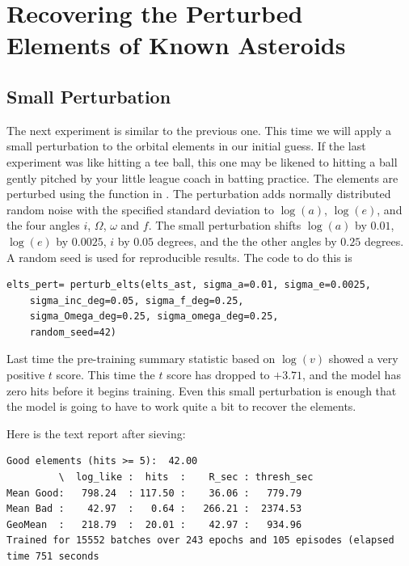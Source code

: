 \section{Recovering the Perturbed Elements of Known Asteroids}
\label{section_results_known_ast_perturbed}

\subsection{Small Perturbation}
The next experiment is similar to the previous one.
This time we will apply a small perturbation to the orbital elements in our initial guess.
If the last experiment was like hitting a tee ball, this one may be likened to hitting a ball gently pitched by your little league coach in batting practice.
The elements are perturbed using the function  in .
The perturbation adds normally distributed random noise with the specified standard deviation
to $\log(a)$, $\log(e)$, and the four angles $i$, $\Omega$, $\omega$ and $f$.
The small perturbation shifts $\log(a)$ by $0.01$, $\log(e)$ by $0.0025$, $i$ by $0.05$ degrees,
and the the other angles by $0.25$ degrees.
A random seed is used for reproducible results.
The code to do this is
\begin{lstlisting}[style=CodeSnippet]
elts_pert= perturb_elts(elts_ast, sigma_a=0.01, sigma_e=0.0025, 
	sigma_inc_deg=0.05, sigma_f_deg=0.25, 
	sigma_Omega_deg=0.25, sigma_omega_deg=0.25,
	random_seed=42)
\end{lstlisting}
Last time the pre-training summary statistic based on $\log(v)$ showed a very positive $t$ score.
This time the $t$ score has dropped to $+3.71$, and the model has zero hits before it begins training.
Even this small perturbation is enough that the model is going to have to work quite a bit to recover the elements.

Here is the text report after sieving:
\begin{lstlisting}[style=CodeSnippet]
Good elements (hits >= 5):  42.00
         \  log_like :  hits  :    R_sec : thresh_sec
Mean Good:   798.24  : 117.50 :    36.06 :   779.79
Mean Bad :    42.97  :   0.64 :   266.21 :  2374.53
GeoMean  :   218.79  :  20.01 :    42.97 :   934.96
Trained for 15552 batches over 243 epochs and 105 episodes (elapsed time 751 seconds
\end{lstlisting}

